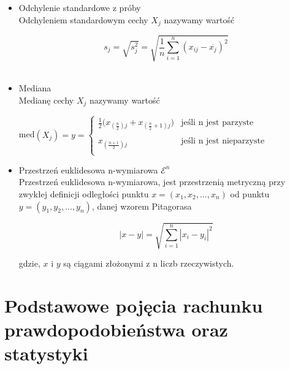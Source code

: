 \documentclass[12pt,a4paper]{report}
\begin{document}
\begin{itemize}
\item Odchylenie standardowe z próby \cite[Rozdział 2.2]{mlodak2006}\\
Odchyleniem standardowym cechy $X_{j}$  nazywamy wartość 
\begin{center}

$$s_{j}= \sqrt{ s_{j}^2} = \sqrt{\frac{1}{n}\sum_{i=1}^{n} (x_{ij} - \overline{x_{j}})^2}$$\\

\end{center}

\item Mediana \cite[Rozdział 2.2]{mlodak2006}\\
Medianę cechy $X_{j}$ nazywamy wartość \\
\begin{center}

med$(X_{j})= 
y = \left\{ \begin{array}{ll}
\frac{1}{2}\big(x_{(\frac{n}{2})j} + x_{(\frac{n}{2}+1)j}\big) & \textrm{jeśli n jest parzyste} \\\\
x_{(\frac{n+1}{2})j} & \textrm{jeśli n jest nieparzyste}\\

\end{array} \right.
$\\
\end{center}

\item Przestrzeń euklidesowa n-wymiarowa $\mathcal{E}^n$ \citep[Rozdział 9]{kuratowski2004}\\
Przestrzeń euklidesowa n-wymiarowa, jest przestrzenią metryczną przy zwykłej definicji odległości punktu $x=(x_1,x_2,...,x_n)$ od punktu $y=(y_1,y_2,...,y_n)$, danej wzorem Pitagorasa
\begin{center}
$$|x - y| =\sqrt{\sum_{i=1}^{n} |x_i - y_i|^2}$$
\end{center}
gdzie, $x$ i $y$ są ciągami złożonymi z n liczb rzeczywistych.
\end{itemize}


\newpage



\section{Podstawowe pojęcia rachunku prawdopodobieństwa oraz statystyki}
\noindent
\end{document}
